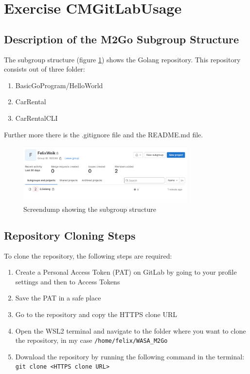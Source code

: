 \label{sec:exercise_cm_gitlab_usage}

\section{Exercise CMGitLabUsage}

\subsection{Description of the M2Go Subgroup Structure}
The subgroup structure (figure \ref*{fig:screendump_subgroupStructure}) shows the Golang repository.
This repository consists out of three folder:
\begin{enumerate}
    \item BasicGoProgram/HelloWorld
    \item CarRental
    \item CarRentalCLI
\end{enumerate}
Further more there is the .gitignore file and the README.md file.

\begin{figure}[h]
    \centering
    \includegraphics[width=0.8\textwidth]{figures/goLang/golang_personalSubgroupStructure.png}
    \caption{Screendump showing the subgroup structure}
    \label{fig:screendump_subgroupStructure}
\end{figure}

\subsection{Repository Cloning Steps}
To clone the repository, the following steps are required:
\begin{enumerate}
    \item Create a Personal Access Token (PAT) on GitLab by going to your profile settings and then to Access Tokens
    \item Save the PAT in a safe place
    \item Go to the repository and copy the HTTPS clone URL
    \item Open the WSL2 terminal and navigate to the folder where you want to clone the repository, in my case \texttt{/home/felix/WASA\_M2Go}
    \item Download the repository by running the following command in the terminal: \texttt{git clone <HTTPS clone URL>}
\end{enumerate}

